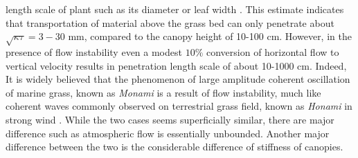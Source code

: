 \documentclass[12pt]{report}   %
\begin{document}
length scale of plant such as its diameter or leaf width \cite{Nepf99}. This estimate indicates that transportation of material above the grass bed can only penetrate about $\sqrt{\kappa \tau} = 3-30$ mm, compared to the canopy height of 10-100 cm. However, in the presence of flow instability even a modest $10\%$ conversion of horizontal flow to vertical velocity results in penetration length scale of about 10-1000 cm. Indeed, It is widely believed that the phenomenon of large amplitude coherent oscillation of marine grass, known as \textit{Monami} is a result of flow instability, much like coherent waves commonly observed on terrestrial grass field, known as \textit{Honami} in strong wind \cite{Inoue55_1, Inoue55_2, Raupach96, Delangre06}. While the two cases seems superficially similar, there are major difference such as atmospheric flow is essentially unbounded. Another major difference between the two is the considerable difference of stiffness of canopies.
\newline
\end{document}

